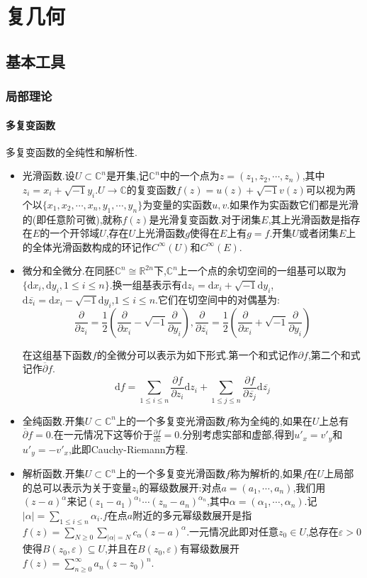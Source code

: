 \newpage
\chapter{复几何}
\section{基本工具}
\subsection{局部理论}
\subsubsection{多复变函数}

多复变函数的全纯性和解析性.
\begin{itemize}
	\item 光滑函数.设$U\subset\mathbb{C}^n$是开集,记$\mathbb{C}^n$中的一个点为$z=(z_1,z_2,\cdots,z_n)$,其中$z_i=x_i+\sqrt{-1}y_i$.$U\to\mathbb{C}$的复变函数$f(z)=u(z)+\sqrt{-1}v(z)$可以视为两个以$\{x_1,x_2,\cdots,x_n,y_1,\cdots,y_n\}$为变量的实函数$u,v$.如果作为实函数它们都是光滑的(即任意阶可微),就称$f(z)$是光滑复变函数.对于闭集$E$,其上光滑函数是指存在$E$的一个开邻域$U$,存在$U$上光滑函数$g$使得在$E$上有$g=f$.开集$U$或者闭集$E$上的全体光滑函数构成的环记作$C^{\infty}(U)$和$C^{\infty}(E)$.
	\item 微分和全微分.在同胚$\mathbb{C}^n\cong\mathbb{R}^{2n}$下,$\mathbb{C}^n$上一个点的余切空间的一组基可以取为$\{\mathrm{d}x_i,\mathrm{d}y_i,1\le i\le n\}$.换一组基表示有$\mathrm{d}z_i=\mathrm{d}x_i+\sqrt{-1}\mathrm{d}y_i$,$\mathrm{d}\overline{z_i}=\mathrm{d}x_i-\sqrt{-1}\mathrm{d}y_i$,$1\le i\le n$.它们在切空间中的对偶基为:
	$$\frac{\partial}{\partial z_i}=\frac{1}{2}\left(\frac{\partial}{\partial x_i}-\sqrt{-1}\frac{\partial}{\partial y_i}\right),\frac{\partial}{\partial\overline{z_i}}=\frac{1}{2}\left(\frac{\partial}{\partial x_i}+\sqrt{-1}\frac{\partial}{\partial y_i}\right)$$
	
	在这组基下函数$f$的全微分可以表示为如下形式.第一个和式记作$\partial f$,第二个和式记作$\overline{\partial}f$.
	$$\mathrm{d}f=\sum_{1\le i\le n}\frac{\partial f}{\partial z_i}\mathrm{d}z_i+\sum_{1\le j\le n}\frac{\partial f}{\partial\overline{z_j}}\mathrm{d}\overline{z_j}$$
	\item 全纯函数.开集$U\subset\mathbb{C}^n$上的一个多复变光滑函数$f$称为全纯的,如果在$U$上总有$\overline{\partial}f=0$.在一元情况下这等价于$\frac{\partial f}{\partial\overline{z}}=0$.分别考虑实部和虚部,得到$u'_x=v'_y$和$u'_y=-v'_x$,此即Cauchy-Riemann方程.
	\item 解析函数.开集$U\subset\mathbb{C}^n$上的一个多复变光滑函数$f$称为解析的,如果$f$在$U$上局部的总可以表示为关于变量$z_i$的幂级数展开:对点$a=(a_1,\cdots,a_n)$,我们用$(z-a)^{\alpha}$来记$(z_1-a_1)^{\alpha_1}\cdots (z_n-a_n)^{\alpha_n}$,其中$\alpha=(\alpha_1,\cdots,\alpha_n)$.记$|\alpha|=\sum_{1\le i\le n}\alpha_i$.$f$在点$a$附近的多元幂级数展开是指$f(z)=\sum_{N\ge0}\sum_{|\alpha|=N}c_{\alpha}(z-a)^{\alpha}$.一元情况此即对任意$z_0\in U$,总存在$\varepsilon>0$使得$B(z_0,\varepsilon)\subseteq U$,并且在$B(z_0,\varepsilon)$有幂级数展开$f(z)=\sum_{n\ge0}^{\infty}a_n(z-z_0)^n$.
\end{itemize}

